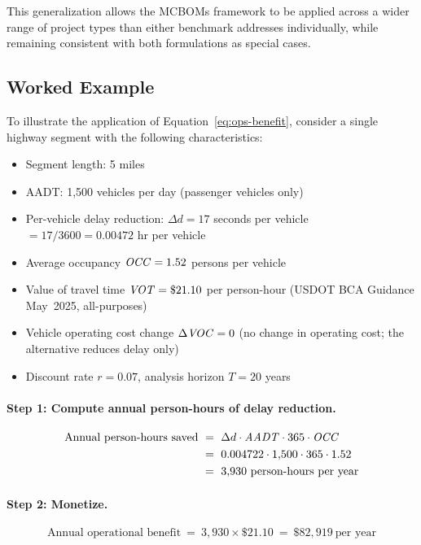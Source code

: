 This generalization allows the MCBOMs framework to be applied across a wider
range of project types than either benchmark addresses individually, while
remaining consistent with both formulations as special cases.

\subsection{Worked Example}

To illustrate the application of Equation~\ref{eq:ops-benefit}, consider a
single highway segment with the following characteristics:

\begin{itemize}[leftmargin=2em, itemsep=2pt]
  \item Segment length: 5 miles
  \item AADT: 1{,}500 vehicles per day (passenger vehicles only)
  \item Per-vehicle delay reduction: $\Delta d = 17$ seconds per vehicle
    $= 17/3600 = 0.00472$ hr per vehicle
  \item Average occupancy $\mathit{OCC} = 1.52$ persons per vehicle
  \item Value of travel time $\mathit{VOT} = \$21.10$ per person-hour (USDOT BCA
    Guidance May~2025, all-purposes)
  \item Vehicle operating cost change $\Delta\mathit{VOC} = 0$ (no change in
    operating cost; the alternative reduces delay only)
  \item Discount rate $r = 0.07$, analysis horizon $T = 20$ years
\end{itemize}

\paragraph{Step 1: Compute annual person-hours of delay reduction.}
\begin{align*}
\text{Annual person-hours saved}
\ &=\ \Delta d \cdot \mathit{AADT} \cdot 365 \cdot \mathit{OCC} \\
\ &=\ 0.004722 \cdot 1{,}500 \cdot 365 \cdot 1.52 \\
\ &=\ 3{,}930 \ \text{person-hours per year}
\end{align*}

\paragraph{Step 2: Monetize.}
\begin{equation*}
\text{Annual operational benefit} \ =\ 3{,}930 \times \$21.10 \ =\ \$82{,}919 \ \text{per year}
\end{equation*}


